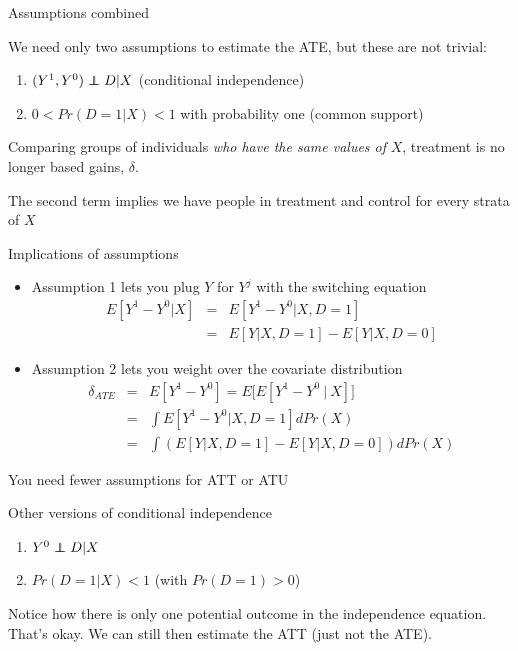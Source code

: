 \documentclass{beamer}
\newcommand\independent{\protect\mathpalette{\protect\independenT}{\perp}}
\def\independenT#1#2{\mathrel{\rlap{$#1#2$}\mkern2mu{#1#2}}}
\begin{document}
\begin{frame}{Assumptions combined}
	
We need only two assumptions to estimate the ATE, but these are not trivial: 
  \begin{enumerate}
		\item $(Y^1,Y^0) \independent{D} | X$ (conditional independence)
		\item $0<Pr(D=1|X)<1$ with probability one (common support)
  \end{enumerate}

\bigskip
Comparing groups of individuals \emph{who have the same values of} $X$, treatment is no longer based gains, $\delta$. 

\bigskip

The second term implies we have people in treatment and control for every strata of $X$
\end{frame}


\begin{frame}{Implications of assumptions}


	\begin{itemize}
	\item Assumption 1 lets you plug $Y$ for $Y^j$ with the switching equation
		\begin{eqnarray*}
		E[Y^1-Y^0|X] &=& E[Y^1 - Y^0 | X,D=1] \\
		&=&E[Y|X,D=1] - E[Y|X,D=0]
		\end{eqnarray*}
	\item Assumption 2 lets you weight over the covariate distribution
		\begin{eqnarray*}
		\delta_{ATE} &=&E[Y^1-Y^0] = E\bigg[ E[Y^1 - Y^0 \ \vert \ X] \bigg] \\
		&=& \int E[Y^1 - Y^0 |X,D=1] dPr(X) \\
		&=& \int \left(E[Y|X,D=1] - E[Y|X,D=0]\right)dPr(X)
		\end{eqnarray*}
	\end{itemize}

\end{frame}




\begin{frame}{You need fewer assumptions for ATT or ATU}

Other versions of conditional independence

\begin{enumerate}
  \item $Y^0 \independent{D} | X$ 
  \item $Pr(D=1|X)<1$ (with $Pr(D=1)>0$)
\end{enumerate}

\bigskip
Notice how there is only one potential outcome in the independence equation.  That's okay.  We can still then estimate the ATT (just not the ATE).

\end{frame}
\end{document}
